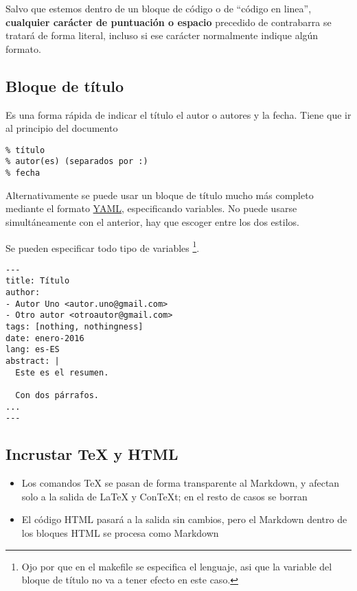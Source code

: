 \documentclass[12pt,spanish,]{article}
\providecommand{\tightlist}{%
  \setlength{\itemsep}{0pt}\setlength{\parskip}{0pt}}
\begin{document}
Salvo que estemos dentro de un bloque de código o de ``código en
linea'', \textbf{cualquier carácter de puntuación o espacio} precedido
de contrabarra se tratará de forma literal, incluso si ese carácter
normalmente indique algún formato.

\subsection{Bloque de título}\label{bloque-de-tuxedtulo}

Es una forma rápida de indicar el título el autor o autores y la fecha.
Tiene que ir al principio del documento

\begin{verbatim}
% título
% autor(es) (separados por :)
% fecha
\end{verbatim}

Alternativamente se puede usar un bloque de título mucho más completo
mediante el formato \href{https://en.wikipedia.org/wiki/YAML}{YAML},
especificando variables. No puede usarse simultáneamente con el
anterior, hay que escoger entre los dos estilos.

Se pueden especificar todo tipo de variables \footnote{Ojo por que en el
  makefile se especifica el lenguaje, asi que la variable del bloque de
  título no va a tener efecto en este caso.}.

\begin{verbatim}
---
title: Título
author:
- Autor Uno <autor.uno@gmail.com>
- Otro autor <otroautor@gmail.com>
tags: [nothing, nothingness]
date: enero-2016
lang: es-ES
abstract: |
  Este es el resumen.

  Con dos párrafos.
...
---
\end{verbatim}

\subsection{Incrustar TeX y HTML}\label{incrustar-tex-y-html}

\begin{itemize}
\tightlist
\item
  Los comandos TeX se pasan de forma transparente al Markdown, y afectan
  solo a la salida de LaTeX y ConTeXt; en el resto de casos se borran
\item
  El código HTML pasará a la salida sin cambios, pero el Markdown dentro
  de los bloques HTML se procesa como Markdown
\end{itemize}
\end{document}
